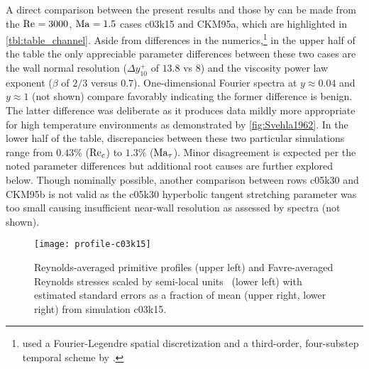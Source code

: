A direct comparison between the present results and those by
\citet{Coleman1995Numerical} can be made from the $\Reynolds=3000$, $\Mach=1.5$
cases c03k15 and CKM95a, which are highlighted in \autoref{tbl:table_channel}.
Aside from differences in the numerics,\footnote{%
    \citeauthor{Coleman1995Numerical} used a Fourier-Legendre spatial
    discretization and a third-order, four-substep temporal scheme
    by \citet{Buell1990Direct}.
}
in the upper half of the table the only appreciable parameter differences
between these two cases are the wall normal resolution ($\Delta{}y^{+}_{10}$ of
$13.8$ vs $8$) and the viscosity power law exponent ($\beta$ of $2/3$ versus
$0.7$).  One-dimensional Fourier spectra at $y\approx{}0.04$ and $y\approx{}1$
(not shown) compare favorably indicating the former difference is benign.  The
latter difference was deliberate as it produces data mildly more appropriate for
high temperature environments as demonstrated by \autoref{fig:Svehla1962}.  In
the lower half of the table, discrepancies between these two particular
simulations range from $0.43\%$ ($\Reynolds[c]{}$) to $1.3\%$ ($\Mach[\tau]$).
Minor disagreement is expected per the noted parameter differences but
additional root causes are further explored below.  Though nominally possible,
another comparison between rows c05k30 and CKM95b is not valid as the c05k30
hyperbolic tangent stretching parameter was too small causing insufficient
near-wall resolution as assessed by spectra (not shown).


\begin{figure}
\centering
\texttt{[image: profile-c03k15]}
\caption[Profiles with quantified uncertainty for $\Reynolds=3000$, $\Mach=1.5$ channel]{%
    Reynolds-averaged primitive profiles (upper left) and Favre-averaged
    Reynolds stresses scaled by semi-local units~\citep{Huang1995Compressible}
    (lower left) with estimated standard errors as a fraction of mean (upper
    right, lower right) from simulation c03k15.\label{fig:basic3k15}
}
\end{figure}

